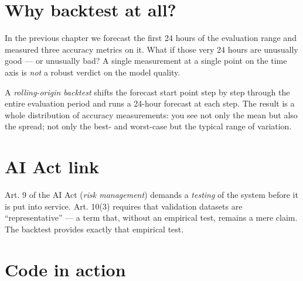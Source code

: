 \documentclass[
  english,
  letterpaper,
]{scrbook}
\begin{document}
\section{Why backtest at all?}\label{why-backtest-at-all}

In the previous chapter we forecast the first 24 hours of the evaluation
range and measured three accuracy metrics on it. What if those very 24
hours are unusually good --- or unusually bad? A single measurement at a
single point on the time axis is \emph{not} a robust verdict on the
model quality.

A \emph{rolling-origin backtest} shifts the forecast start point step by
step through the entire evaluation period and runs a 24-hour forecast at
each step. The result is a whole distribution of accuracy measurements:
you see not only the mean but also the spread; not only the best- and
worst-case but the typical range of variation.

\section{AI Act link}\label{ai-act-link-6}

Art. 9 of the AI Act (\emph{risk management}) demands a \emph{testing}
of the system before it is put into service. Art. 10(3) requires that
validation datasets are ``representative'' --- a term that, without an
empirical test, remains a mere claim. The backtest provides exactly that
empirical test.

\section{Code in action}\label{code-in-action-6}
\end{document}
